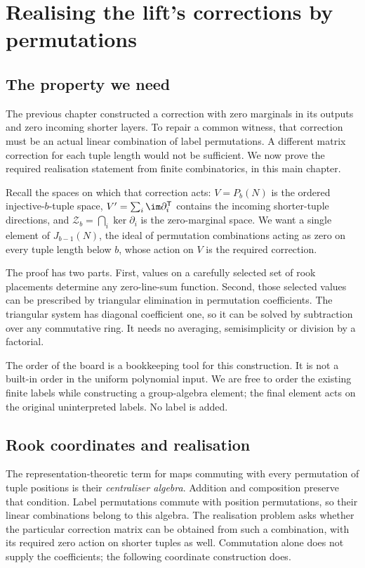 \chapter{Realising the lift's corrections by permutations}\label{tx:sec:rook-realization}
\label{tx:ch:rooks}
\section*{The property we need}
The previous chapter constructed a correction with zero marginals in
its outputs and zero incoming shorter layers. To repair a common
witness, that correction must be an actual linear combination of
label permutations. A different matrix correction for each tuple
length would not be sufficient. We now prove the required realisation
statement from finite combinatorics, in this main chapter.

Recall the spaces on which that correction acts:
$V=P_b(N)$ is the ordered injective-$b$-tuple space,
$V'=\sum_i\im\partial_i^{\mathsf T}$ contains the incoming
shorter-tuple directions, and $\mathcal Z_b=\bigcap_i\ker\partial_i$
is the zero-marginal space. We want a single element of
$J_{b-1}(N)$, the ideal of permutation combinations acting as zero
on every tuple length below $b$, whose action on $V$ is the required
correction.

The proof has two parts. First, values on a carefully selected set
of rook placements determine any zero-line-sum function. Second,
those selected values can be prescribed by triangular elimination
in permutation coefficients. The triangular system has diagonal
coefficient one, so it can be solved by subtraction over any
commutative ring. It needs no averaging, semisimplicity or division
by a factorial.

The order of the board is a bookkeeping tool for this construction.
It is not a built-in order in the uniform polynomial input. We are
free to order the existing finite labels while constructing a
group-algebra element; the final element acts on the original
uninterpreted labels. No label is added.

\section{Rook coordinates and realisation}\label{tx:sec:rooks}
The representation-theoretic term for maps commuting with every
permutation of tuple positions is their \emph{centraliser algebra}.
Addition and composition preserve that condition. Label permutations
commute with position permutations, so their linear combinations
belong to this algebra. The realisation problem asks whether the
particular correction matrix can be obtained from such a combination,
with its required zero action on shorter tuples as well.
Commutation alone does not supply the coefficients; the following
coordinate construction does.

